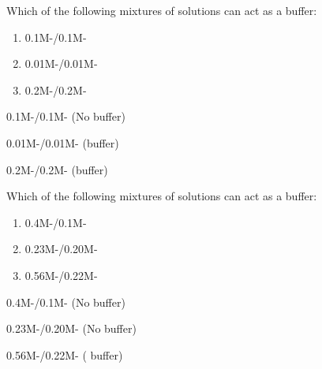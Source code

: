 \documentclass[main.tex]{subfiles}
\begin{document}
\begin{multicols*}{2}
\begin{question}[ID=\the\value{numA}]
Which of the following mixtures of solutions can act as a buffer:
\begin{enumerate}[label=(\alph*)]
\item 0.1M-/0.1M- %
\item 0.01M-/0.01M- %
\item 0.2M-/0.2M- %
 \end{enumerate}
\end{question}
\begin{solution}
\begin{inparaenum}[(a)]
\item 0.1M-/0.1M-   (No buffer)
\item 0.01M-/0.01M-   (buffer)
\item 0.2M-/0.2M-   (buffer)
 \end{inparaenum}
\hspace{0.1cm}\end{solution}%


\begin{question}[ID=\the\value{numA}]
Which of the following mixtures of solutions can act as a buffer:
\begin{enumerate}[label=(\alph*)]
\item 0.4M-/0.1M- %
\item 0.23M-/0.20M- %
\item 0.56M-/0.22M- %
 \end{enumerate}
\end{question}
\begin{solution}
\begin{inparaenum}[(a)]
\item 0.4M-/0.1M-   (No buffer)
\item 0.23M-/0.20M-   (No buffer)
\item 0.56M-/0.22M-   ( buffer)
 \end{inparaenum}
\hspace{0.1cm}\end{solution}%


\end{multicols*}
\end{document}
